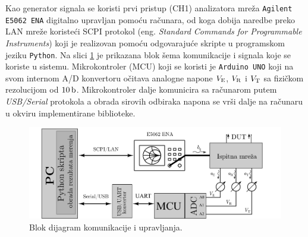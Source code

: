 \documentclass[a4paper, 12pt, diplomski]{etf}
\newcommand{\unit}[1]{\,{\rm #1}}
\begin{document}
%
Kao generator signala se koristi prvi pristup (CH1)
analizatora mreža 
 \texttt{Agilent E5062 ENA} digitalno upravljan pomoću računara, od koga dobija naredbe 
 preko LAN mreže koristeći SCPI protokol (eng. \textit{Standard Commands for Programmable Instruments}) koji je realizovan pomoću odgovarajuće 
 skripte u programskom jeziku \texttt{Python}. Na slici \ref{fig:sna_complete_comm} je prikazana blok šema komunikacije i signala 
 koje se koriste u sistemu. Mikrokontroler (MCU)
 koji se koristi je
 \texttt{Arduino UNO} koji na svom internom A/D konvertoru 
 očitava analogne napone $V_{\rm E}$, $V_{\rm R}$ i $V_{\rm T}$
 sa fizičkom rezolucijom od $10\unit{b}$.
% 
Mikrokontroler dalje komunicira sa računarom putem 
\textit{USB/Serial} protokola a obrada sirovih odbiraka napona se vrši dalje na računaru u okviru 
implementirane biblioteke.

\begin{figure}[ht!]
    \centering
    \includegraphics[width=158.95000mm]{fig/BLOK.png}
    \caption{Blok dijagram komunikacije i upravljanja.}
    \label{fig:sna_complete_comm}
\end{figure}
\end{document}
